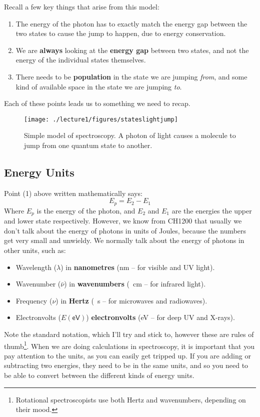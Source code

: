 Recall a few key things that arise from this model:
\begin{enumerate}
\item The energy of the photon has to exactly match the energy gap between the two states to cause the jump to happen, due to energy conservation. 
\item We are \textbf{always} looking at the \textbf{energy gap} between two states, and not the energy of the individual states themselves.
\item There needs to be \textbf{population} in the state we are jumping \textit{from}, and some kind of available space in the state we are jumping \textit{to}.
\end{enumerate}
Each of these points leads us to something we need to recap. 
\begin{figure}[h!]
\centering
\texttt{[image: ./lecture1/figures/stateslightjump]}
\caption{Simple model of spectroscopy. A photon of light causes a molecule to jump from one quantum state to another.}\label{fig:stateslightjump}
\end{figure}
\subsection{Energy Units}
Point (1) above written mathematically says:
\begin{equation*}
E_p = E_2 - E_1
\end{equation*}
Where $E_p$ is the energy of the photon, and $E_2$ and $E_1$ are the energies the upper and lower state respectively. However, we know from CH1200 that usually we don't talk about the energy of photons in units of Joules, because the numbers get very small and unwieldy. We normally talk about the energy of photons in other units, such as:
\begin{itemize}
\item Wavelength ($\lambda$) in \textbf{nanometres} (\si{\nano\metre} -- for visible and UV light). 
\item Wavenumber ($\bar{\nu}$) in \textbf{wavenumbers} (\si{\per\centi\metre} -- for infrared light).
\item Frequency ($\nu$) in \textbf{Hertz} (\si{\per\second} -- for microwaves and radiowaves). 
\item Electronvolts ($E(\mathsf{eV})$) \textbf{electronvolts} (\si{\electronvolt} -- for deep UV and X-rays). 
\end{itemize}
Note the standard notation, which I'll try and stick to, however these are rules of thumb\footnote{Rotational spectroscopists use both Hertz and wavenumbers, depending on their mood.}. When we are doing calculations in spectroscopy, it is important that you pay attention to the units, as you can easily get tripped up. If you are adding or subtracting two energies, they need to be in the same units, and so you need to be able to convert between the different kinds of energy units. 

